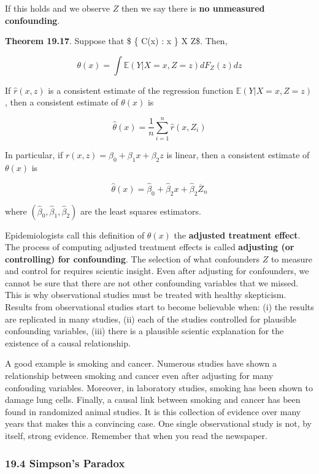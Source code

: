 If this holds and we observe \(Z\) then we say there is \textbf{no
unmeasured confounding}.

\textbf{Theorem 19.17}. Suppose that \$ \{ C(x) : x \in {} \}
 X \textbar{} Z\$. Then,

\[ \theta(x) = \int \mathbb{E}(Y | X = x, Z = z) d F_Z(z) dz \]

If \(\hat{r}(x, z)\) is a consistent estimate of the regression function
\(\mathbb{E}(Y | X = x, Z = z)\), then a consistent estimate of
\(\theta(x)\) is

\[ \hat{\theta}(x) = \frac{1}{n} \sum_{i=1}^n \hat{r}(x, Z_i) \]

In particular, if \(r(x, z) = \beta_0 + \beta_1 x + \beta_2 z\) is
linear, then a consistent estimate of \(\theta(x)\) is

\[ \hat{\theta}(x) = \hat{\beta}_0 + \hat{\beta}_2 x + \hat{\beta}_2 \overline{Z}_n \]

where \((\hat{\beta}_0, \hat{\beta}_1, \hat{\beta}_2)\) are the least
squares estimators.

Epidemiologists call this definition of \(\theta(x)\) the
\textbf{adjusted treatment effect}. The process of computing adjusted
treatment effects is called \textbf{adjusting (or controlling) for
confounding}. The selection of what confounders \(Z\) to measure and
control for requires scientic insight. Even after adjusting for
confounders, we cannot be sure that there are not other confounding
variables that we missed. This is why observational studies must be
treated with healthy skepticism. Results from observational studies
start to become believable when: (i) the results are replicated in many
studies, (ii) each of the studies controlled for plausible confounding
variables, (iii) there is a plausible scientic explanation for the
existence of a causal relationship.

A good example is smoking and cancer. Numerous studies have shown a
relationship between smoking and cancer even after adjusting for many
confouding variables. Moreover, in laboratory studies, smoking has been
shown to damage lung cells. Finally, a causal link between smoking and
cancer has been found in randomized animal studies. It is this
collection of evidence over many years that makes this a convincing
case. One single observational study is not, by itself, strong evidence.
Remember that when you read the newspaper.

\subsubsection{19.4 Simpson's Paradox}\label{simpsons-paradox}

